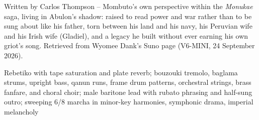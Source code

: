 
\label{sec:no-griot-for-thee}
\begin{notes}
Written by Carlos Thompson -- Mombuto's own perspective within the \emph{Monukae} saga, living in Abulon's shadow: raised to read power and war rather than to be sung about like his father, torn between his land and his navy, his Peruvian wife and his Irish wife (Gladiel), and a legacy he built without ever earning his own griot's song. Retrieved from Wyomee Dank's Suno page (V6-MINI, 24 September 2026).
\end{notes}
\begin{style}
Rebetiko with tape saturation and plate reverb; bouzouki tremolo, baglama strums, upright bass, qanun runs, frame drum patterns, orchestral strings, brass fanfare, and choral choir; male baritone lead with rubato phrasing and half-sung outro; sweeping 6/8 marcha in minor-key harmonies, symphonic drama, imperial melancholy
\end{style}

